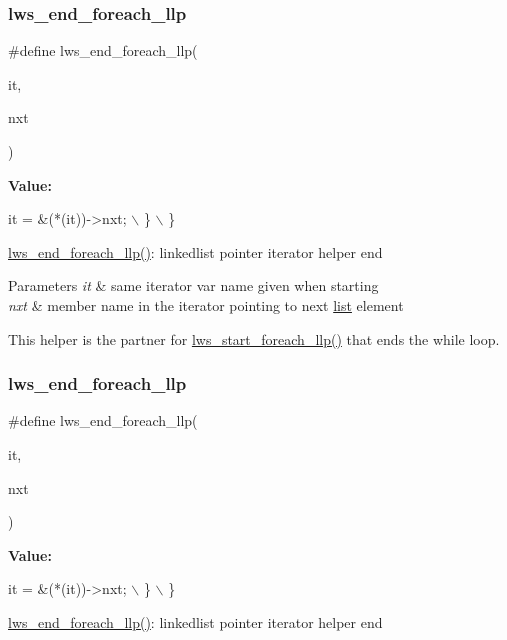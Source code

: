 \subsubsection{\texorpdfstring{lws\+\_\+end\+\_\+foreach\+\_\+llp}{lws\_end\_foreach\_llp}\hspace{0.1cm}{\footnotesize\ttfamily [3/6]}}
{\footnotesize\ttfamily \#define lws\+\_\+end\+\_\+foreach\+\_\+llp(\begin{DoxyParamCaption}\item[{}]{it,  }\item[{}]{nxt }\end{DoxyParamCaption})}

{\bfseries Value\+:}
\begin{DoxyCode}
it = &(*(it))->nxt; \(\backslash\)
    \} \(\backslash\)
\}
\end{DoxyCode}
\hyperlink{group__misc_gaba92c53b57f3e689f8568b02184a8d84}{lws\+\_\+end\+\_\+foreach\+\_\+llp()}\+: linkedlist pointer iterator helper end


\begin{DoxyParams}{Parameters}
{\em it} & same iterator var name given when starting \\
\hline
{\em nxt} & member name in the iterator pointing to next \hyperlink{protocollist-p}{list} element\\
\hline
\end{DoxyParams}
This helper is the partner for \hyperlink{group__misc_gad973ecfe2ac066ba0ea1ec3695d3e896}{lws\+\_\+start\+\_\+foreach\+\_\+llp()} that ends the while loop. \mbox{\label{group__misc_gaba92c53b57f3e689f8568b02184a8d84}} 
\subsubsection{\texorpdfstring{lws\+\_\+end\+\_\+foreach\+\_\+llp}{lws\_end\_foreach\_llp}\hspace{0.1cm}{\footnotesize\ttfamily [4/6]}}
{\footnotesize\ttfamily \#define lws\+\_\+end\+\_\+foreach\+\_\+llp(\begin{DoxyParamCaption}\item[{}]{it,  }\item[{}]{nxt }\end{DoxyParamCaption})}

{\bfseries Value\+:}
\begin{DoxyCode}
it = &(*(it))->nxt; \(\backslash\)
    \} \(\backslash\)
\}
\end{DoxyCode}
\hyperlink{group__misc_gaba92c53b57f3e689f8568b02184a8d84}{lws\+\_\+end\+\_\+foreach\+\_\+llp()}\+: linkedlist pointer iterator helper end


